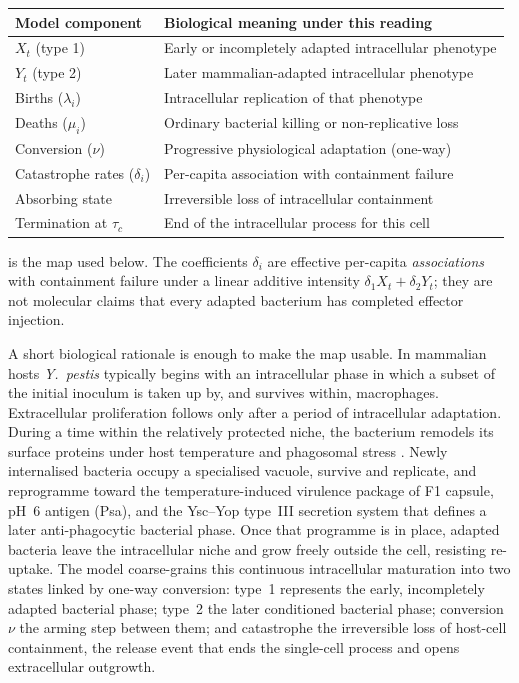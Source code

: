 \begin{center}
\small
{}
\label{tab:bio-mapping} 
\begin{tabular}{@{}p{}p{}@{}}
\toprule
Model component & Biological meaning under this reading \\
\midrule
$X_t$ (type 1) & Early or incompletely adapted intracellular phenotype \\
$Y_t$ (type 2) & Later mammalian-adapted intracellular phenotype \\
Births ($\lambda_i$) & Intracellular replication of that phenotype \\
Deaths ($\mu_i$) & Ordinary bacterial killing or non-replicative loss \\
Conversion ($\nu$) & Progressive physiological adaptation (one-way) \\
Catastrophe rates ($\delta_i$) & Per-capita association with containment failure \\
Absorbing state & Irreversible loss of intracellular containment \\
Termination at $\tau_c$ & End of the intracellular process for this cell \\
\bottomrule
\end{tabular}
\end{center}

 is the map used below. The coefficients $\delta_i$ are effective per-capita \emph{associations} with containment failure under a linear additive intensity $\delta_1X_t+\delta_2Y_t$; they are not molecular claims that every adapted bacterium has completed effector injection.

A short biological rationale is enough to make the map usable. In mammalian hosts \textit{Y.\ pestis} typically begins with an intracellular phase in which a subset of the initial inoculum is taken up by, and survives within, macrophages. Extracellular proliferation follows only after a period of intracellular adaptation. During a time within the relatively protected niche, the bacterium remodels its surface proteins under host temperature and phagosomal stress \cite{PujolBliska2003,ConnorEtAl2018,KeEtAl2013}. Newly internalised bacteria occupy a specialised vacuole, survive and replicate, and reprogramme toward the temperature-induced virulence package of F1 capsule, pH~6 antigen (Psa), and the Ysc--Yop type~III secretion system that defines a later anti-phagocytic bacterial phase. Once that programme is in place, adapted bacteria leave the intracellular niche and grow freely outside the cell, resisting re-uptake. The model coarse-grains this continuous intracellular maturation into two states linked by one-way conversion: type~1 represents the early, incompletely adapted bacterial phase; type~2 the later conditioned bacterial phase; conversion~$\nu$ the arming step between them; and catastrophe the irreversible loss of host-cell containment, the release event that ends the single-cell process and opens extracellular outgrowth.

